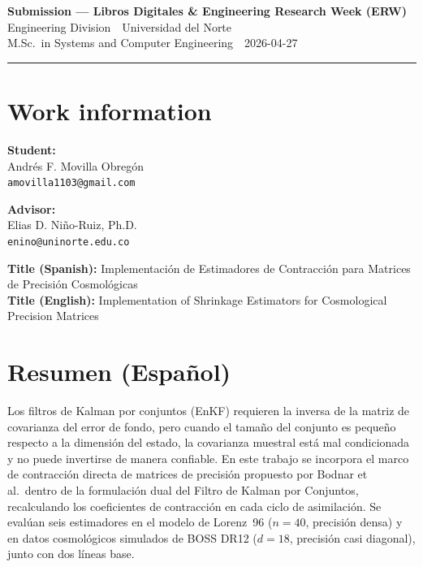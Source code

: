 \documentclass[11pt, a4paper]{article}
\begin{document}
\begin{center}
  {\color{unBlue}\LARGE\bfseries Submission --- Libros Digitales \& Engineering Research Week (ERW)}\\[4pt]
  {\large Engineering Division \,\textperiodcentered\, Universidad del Norte}\\[2pt]
  M.Sc.\ in Systems and Computer Engineering \,\textperiodcentered\, 2026-04-27
\end{center}

\vspace{4pt}\hrule\vspace{4pt}

\section*{Work information}

\noindent
\begin{minipage}[t]{0.48\linewidth}
\textbf{Student:}\\
Andr\'es F. Movilla Obreg\'on\\
\texttt{amovilla1103@gmail.com}
\end{minipage}\hfill
\begin{minipage}[t]{0.48\linewidth}
\textbf{Advisor:}\\
Elias D. Ni\~no-Ruiz, Ph.D.\\
\texttt{enino@uninorte.edu.co}
\end{minipage}

\vspace{4pt}
\textbf{Title (Spanish):} Implementaci\'on de Estimadores de Contracci\'on para Matrices de Precisi\'on Cosmol\'ogicas\\
\textbf{Title (English):} Implementation of Shrinkage Estimators for Cosmological Precision Matrices

\section*{Resumen (Espa\~nol)}

Los filtros de Kalman por conjuntos (EnKF) requieren la inversa de la matriz de covarianza del error de fondo, pero cuando el tama\~no del conjunto es peque\~no respecto a la dimensi\'on del estado, la covarianza muestral est\'a mal condicionada y no puede invertirse de manera confiable. En este trabajo se incorpora el marco de contracci\'on directa de matrices de precisi\'on propuesto por Bodnar et al.\ dentro de la formulaci\'on dual del Filtro de Kalman por Conjuntos, recalculando los coeficientes de contracci\'on en cada ciclo de asimilaci\'on. Se eval\'uan seis estimadores en el modelo de Lorenz~96 ($n=40$, precisi\'on densa) y en datos cosmol\'ogicos simulados de BOSS DR12 ($d=18$, precisi\'on casi diagonal), junto con dos l\'ineas base.
\end{document}
